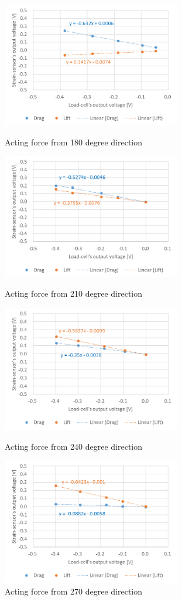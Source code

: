 \documentclass[twocolumn,a4j]{jsarticle}
\begin{document}
\begin{figure}[htbp]
    \footnotesize
    \begin{center}
        \includegraphics[width=78mm]{../../2111/images/180.png}
        \caption{Acting force from 180 degree direction}
        \includegraphics[width=78mm]{../../2111/images/210.png}
        \caption{Acting force from 210 degree direction}
        \includegraphics[width=78mm]{../../2111/images/240.png}
        \caption{Acting force from 240 degree direction}
        \includegraphics[width=78mm]{../../2111/images/270.png}
        \caption{Acting force from 270 degree direction}
    \end{center}
\end{figure}
\end{document}
